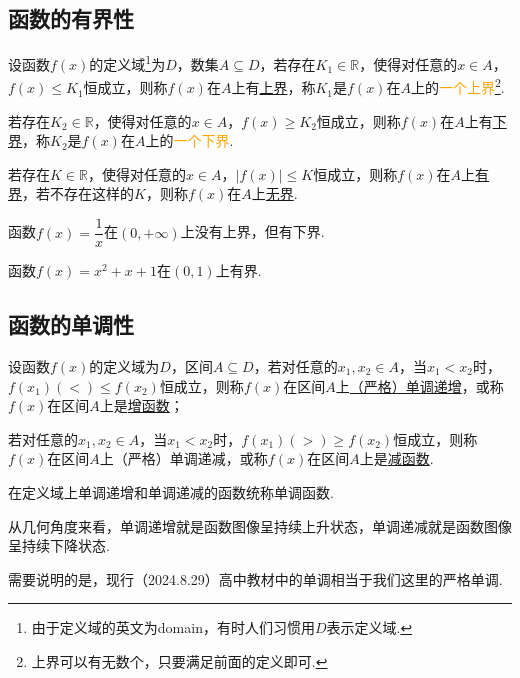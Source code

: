 \documentclass[lang=cn,math=cm,chinesefont=nofont,11pt,scheme=chinese,twocol]{elegantbook}
\begin{document}
\subsection{函数的有界性}

\begin{definition}
  设函数$f(x)$的定义域\footnote{由于定义域的英文为domain，有时人们习惯用$D$表示定义域.}为$D$，数集$A\subseteq D$，若存在$K_1\in\mathbb{R}$，使得对任意的$x\in A$，$f(x)\leqslant K_1$恒成立，则称$f(x)$在$A$上有\underline{上界}，称$K_1$是$f(x)$在$A$上的\textcolor{orange}{一个上界}\footnote{上界可以有无数个，只要满足前面的定义即可.}.

  若存在$K_2\in\mathbb{R}$，使得对任意的$x\in A$，$f(x)\geqslant K_2$恒成立，则称$f(x)$在$A$上有\underline{下界}，称$K_2$是$f(x)$在$A$上的\textcolor{orange}{一个下界}.

  若存在$K\in\mathbb{R}$，使得对任意的$x\in A$，$\left|f(x)\right|\leqslant K$恒成立，则称$f(x)$在$A$上\underline{有界}，若不存在这样的$K$，则称$f(x)$在$A$上\underline{无界}.
\end{definition}

\begin{example}
  函数$f(x)=\dfrac1x$在$(0,+\infty)$上没有上界，但有下界.
\end{example}

\begin{example}
  函数$f(x)=x^2+x+1$在$(0,1)$上有界.
\end{example}

\subsection{函数的单调性}

\begin{definition}
  设函数$f(x)$的定义域为$D$，区间$A\subseteq D$，若对任意的$x_1,x_2\in A$，当$x_1<x_2$时，$f(x_1)(<)\leqslant f(x_2)$恒成立，则称$f(x)$在区间$A$上\underline{（严格）单调递增}，或称$f(x)$在区间$A$上是\underline{增函数}；

  若对任意的$x_1,x_2\in A$，当$x_1<x_2$时，$f(x_1)(>)\geqslant f(x_2)$恒成立，则称$f(x)$在区间$A$上（严格）单调递减，或称$f(x)$在区间$A$上是\underline{减函数}.

  在定义域上单调递增和单调递减的函数统称单调函数.
\end{definition}

从几何角度来看，单调递增就是函数图像呈持续上升状态，单调递减就是函数图像呈持续下降状态.

需要说明的是，现行（2024.8.29）高中教材中的单调相当于我们这里的严格单调.
\end{document}

